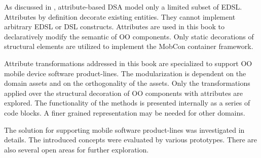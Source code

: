 


\noindent As discussed in , attribute-based DSA model only a limited subset of EDSL. Attri\-bu\-tes by definition decorate existing entities. They cannot implement arbitrary EDSL or DSL constructs. Attributes are used in this book to declaratively modify the semantic of OO components. Only static decorations of structural elements are utilized to implement the MobCon container framework.

Attribute transformations addressed in this book  are specialized to support OO mobile device software product-lines. The modularization is dependent on the domain assets and on the orthogonality of the assets. Only the transformations applied over the structural decoration of OO components with attributes are explored. The functionality of the methods is presented internally as a series of code blocks. A finer grained representation may be needed for other domains.

The solution for supporting mobile software product-lines was investigated in details. The introduced concepts were evaluated by various prototypes. There are also several open areas for further exploration.

